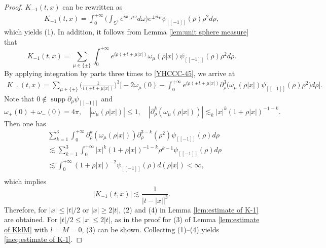 \documentclass[11pt,twoside]{article}
\def\f{\frac}
\def\p{\partial}
\def\ls{\lesssim}
\DeclareMathOperator{\supp}{supp}
\theoremstyle{plain}
\theoremstyle{definition}
\numberwithin{equation}{section}
\begin{document}
	\begin{proof}
		$K_{-1}(t,x)$ can be rewritten as
		\begin{equation*}
			\begin{split}
		K_{-1}(t,x)=\int_{0}^{+\infty}\big(\int_{\mathbb{S}^{2}}e^{ix\cdot\rho\omega}d\omega\big)e^{\pm it\rho}\psi_{[[-1]]}(\rho) \rho^2d\rho,
			\end{split}
		\end{equation*}
which yields (1). In addition, it follows from Lemma \ref{lem:unit sphere measure} that
		\begin{equation}\label{YHCCC-45}
			K_{-1}(t,x)=\sum_{\mu\in\{\pm\}}\int_{0}^{+\infty}e^{i\rho(\pm t+\mu|x|)}\omega_{\mu}(\rho|x|)\psi_{[[-1]]}(\rho) \rho^2 d\rho.
		\end{equation}
		By applying integration by parts three times to \eqref{YHCCC-45}, we arrive at
		\begin{equation}\label{2.200}
			\begin{split}
				K_{-1}(t,x)=\sum_{\mu\in\{\pm\}}\big(\f{1}{i(\pm t+\mu|x|)}\big)^3\big[-2\omega_{\mu}(0)-
				\int_{0}^{+\infty}e^{i\rho(\pm t+\mu|x|)} \p_\rho^3\big(\omega_{\mu}(\rho|x|)\psi_{[[-1]]}(\rho) \rho^2\big)d\rho\big].
			\end{split}
		\end{equation}
		Note that $0\notin\supp\p_\rho\psi_{[[-1]]}$ and
		\begin{equation*}
			\omega_{+}(0)+\omega_{-}(0)=4\pi,\quad |\omega_{\mu}(\rho |x|)|\le 1,
\quad |\p_\rho^k(\omega_{\mu}(\rho |x|))|\ls_k|x|^k(1+\rho|x|)^{-1-k}.
		\end{equation*}
		Then one has
		\begin{equation*}
			\begin{split}
				&\sum_{k=1}^{3}\int_{0}^{+\infty}\p_\rho^k\left(\omega_{\mu}(\rho|x|)\right)\p_\rho^{3-k}(\rho^2)\psi_{[[-1]]}(\rho) d\rho\\
				&\ls
				\sum_{k=1}^{3}\int_{0}^{+\infty}|x|^k(1+\rho|x|)^{-1-k} \rho^{k-1} \psi_{[[-1]]}(\rho) d\rho\\
				&\ls
				\int_{0}^{+\infty}(1+\rho|x|)^{-2} \psi_{[[-1]]}(\rho) d(\rho|x|)<\infty,\\
			\end{split}
		\end{equation*}
		which implies
		\begin{equation*}
			|K_{-1}(t,x)|\ls\f{1}{|t-|x||^3}.
		\end{equation*}
	Therefore, for $|x|\le |t|/2$ or $|x|\ge 2|t|$, (2) and (4) in Lemma \ref{lem:estimate of K-1} are obtained.
		For $|t|/2\le |x|\le 2|t|$, as in the proof for (3) of Lemma \ref{lem:estimate of KklM} with $l=M=0$,
(3) can be shown. Collecting (1)--(4) yields \eqref{ineq:estimate of K-1}.
	\end{proof}
\end{document}
